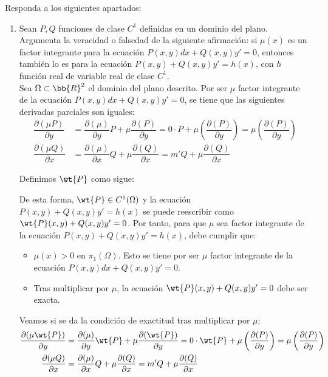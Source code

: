 \documentclass[12pt]{article}
\begin{document}
\begin{ejercicio}
    Responda a los siguientes apartados:
    \begin{enumerate}
        \item Sean $P,Q$ funciones de clase $C^1$ definidas en un dominio del plano. Argumenta la veracidad o falsedad de la siguiente afirmación: si $\mu(x)$ es un factor integrante para la ecuación $P(x,y)dx+Q(x,y)y'=0$, entonces también lo es para la ecuación $P(x,y)+Q(x,y)y'=h(x)$, con $h$ función real de variable real de clase $C^1$.\\
        
        Sea $\Omega\subset \bb{R}^2$ el dominio del plano descrito. Por ser $\mu$ factor integrante de la ecuación $P(x,y)dx+Q(x,y)y'=0$, se tiene que las siguientes derivadas parciales son iguales:
        \begin{align*}
            \dfrac{\partial(\mu P)}{\partial y}&=\dfrac{\partial(\mu)}{\partial y}P+\mu\dfrac{\partial(P)}{\partial y}=0\cdot P+\mu\left(\dfrac{\partial(P)}{\partial y}\right) = \mu\left(\dfrac{\partial(P)}{\partial y}\right)\\
            \dfrac{\partial(\mu Q)}{\partial x}&=\dfrac{\partial(\mu)}{\partial x}Q+\mu\dfrac{\partial(Q)}{\partial x}=m'Q + \mu\dfrac{\partial(Q)}{\partial x}
        \end{align*}

        Definimos $\wt{P}$ como sigue:

        De esta forma, $\wt{P}\in C^1(\Omega)$ y la ecuación $P(x,y)+Q(x,y)y'=h(x)$ se puede reescribir como $\wt{P}(x,y)+Q(x,y)y'=0$. Por tanto, para que $\mu$ sea factor integrante de la ecuación $P(x,y)+Q(x,y)y'=h(x)$, debe cumplir que:
        \begin{itemize}
            \item $\mu(x)>0$ en $\pi_1(\Omega)$. Esto se tiene por ser $\mu$ factor integrante de la ecuación $P(x,y)dx+Q(x,y)y'=0$.
            \item Tras multiplicar por $\mu$, la ecuación $\wt{P}(x,y)+Q(x,y)y'=0$ debe ser exacta.
        \end{itemize}

        Veamos si se da la condición de exactitud tras multiplicar por $\mu$:
        \begin{align*}
            \dfrac{\partial(\mu \wt{P})}{\partial y}&=\dfrac{\partial(\mu)}{\partial y}\wt{P}+\mu\dfrac{\partial(\wt{P})}{\partial y}=0\cdot \wt{P}+\mu\left(\dfrac{\partial(P)}{\partial y}\right) = \mu\left(\dfrac{\partial(P)}{\partial y}\right)\\
            \dfrac{\partial(\mu Q)}{\partial x}&=\dfrac{\partial(\mu)}{\partial x}Q+\mu\dfrac{\partial(Q)}{\partial x}=m'Q + \mu\dfrac{\partial(Q)}{\partial x}
        \end{align*}


\end{enumerate}
\end{ejercicio}
\end{document}
